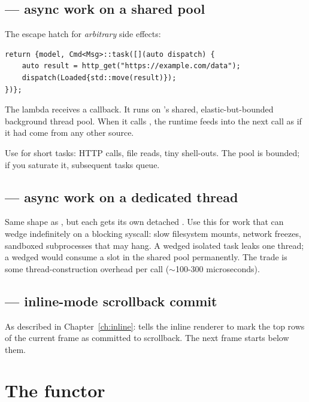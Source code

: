 \subsection{ --- async work on a shared pool}

The escape hatch for \emph{arbitrary} side effects:

\begin{lstlisting}
return {model, Cmd<Msg>::task([](auto dispatch) {
    auto result = http_get("https://example.com/data");
    dispatch(Loaded{std::move(result)});
})};
\end{lstlisting}

The lambda receives a  callback. It runs on \maya{}'s
shared, elastic-but-bounded background thread pool. When it calls
, the runtime feeds  into the next
 call as if it had come from any other source.

Use  for short tasks: HTTP calls, file reads, tiny
shell-outs. The pool is bounded; if you saturate it, subsequent
tasks queue.

\subsection{ --- async work on a dedicated thread}

Same shape as , but each  gets its own
detached . Use this for work that can wedge
indefinitely on a blocking syscall: slow filesystem mounts, network
freezes, sandboxed subprocesses that may hang. A wedged isolated
task leaks one thread; a wedged  would consume a slot in
the shared pool permanently. The trade is some thread-construction
overhead per call ($\sim$100-300 microseconds).

\subsection{ --- inline-mode scrollback commit}

As described in Chapter~\ref{ch:inline}: tells the inline renderer
to mark the top  rows of the current frame as committed to
scrollback. The next frame starts below them.

\section{The  functor}

